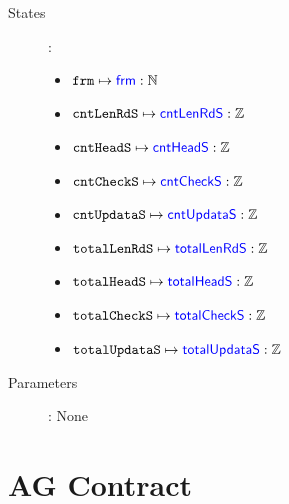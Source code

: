 \documentclass[fleqn,a4paper]{article}
\newcommand\var[1]{\texttt{#1}}
\newcommand\Var[1]{\textcolor{blue}{\textsf{#1}}}
\begin{document}
\begin{description}
\item[States]:
\begin{itemize}
\item $\var{frm} \mapsto \Var{frm} : \mathbb{N}$
\item $\var{cntLenRdS} \mapsto \Var{cntLenRdS} : \mathbb{Z}$
\item $\var{cntHeadS} \mapsto \Var{cntHeadS} : \mathbb{Z}$
\item $\var{cntCheckS} \mapsto \Var{cntCheckS} : \mathbb{Z}$
\item $\var{cntUpdataS} \mapsto \Var{cntUpdataS} : \mathbb{Z}$
\item $\var{totalLenRdS} \mapsto \Var{totalLenRdS} : \mathbb{Z}$
\item $\var{totalHeadS} \mapsto \Var{totalHeadS} : \mathbb{Z}$
\item $\var{totalCheckS} \mapsto \Var{totalCheckS} : \mathbb{Z}$
\item $\var{totalUpdataS} \mapsto \Var{totalUpdataS} : \mathbb{Z}$
\end{itemize}

\item[Parameters]: None

\end{description}

\newpage

\section{AG Contract}
\end{document}
